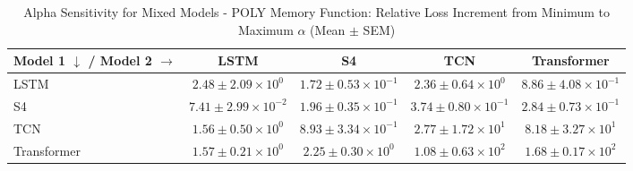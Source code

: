 
\begin{table}[h]
\centering
\caption{Alpha Sensitivity for Mixed Models - POLY Memory Function: Relative Loss Increment from Minimum to Maximum $\alpha$ (Mean $\pm$ SEM)}
\label{tab:mixed_alpha_sensitivity_poly}
\begin{tabular}{lcccc}
\hline
Model 1 $\downarrow$ / Model 2 $\rightarrow$ & LSTM & S4 & TCN & Transformer \\
\hline
LSTM & $2.48 \pm 2.09 \times 10^{0}$ & $1.72 \pm 0.53 \times 10^{-1}$ & $2.36 \pm 0.64 \times 10^{0}$ & $8.86 \pm 4.08 \times 10^{-1}$ \\
S4 & $7.41 \pm 2.99 \times 10^{-2}$ & $1.96 \pm 0.35 \times 10^{-1}$ & $3.74 \pm 0.80 \times 10^{-1}$ & $2.84 \pm 0.73 \times 10^{-1}$ \\
TCN & $1.56 \pm 0.50 \times 10^{0}$ & $8.93 \pm 3.34 \times 10^{-1}$ & $2.77 \pm 1.72 \times 10^{1}$ & $8.18 \pm 3.27 \times 10^{1}$ \\
Transformer & $1.57 \pm 0.21 \times 10^{0}$ & $2.25 \pm 0.30 \times 10^{0}$ & $1.08 \pm 0.63 \times 10^{2}$ & $1.68 \pm 0.17 \times 10^{2}$ \\
\hline
\end{tabular}
\end{table}
